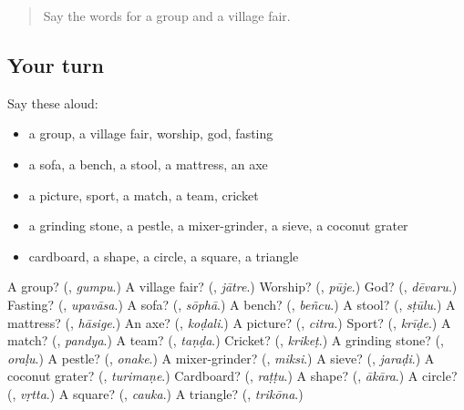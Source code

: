 \begin{quote}
Say the words for a group and a village fair.
\end{quote}

\subsection*{Your turn}
Say these aloud:

\begin{itemize}
\raggedright
  \item a group, a village fair, worship, god, fasting
  \item a sofa, a bench, a stool, a mattress, an axe
  \item a picture, sport, a match, a team, cricket
  \item a grinding stone, a pestle, a mixer-grinder, a sieve, a coconut grater
  \item cardboard, a shape, a circle, a square, a triangle
\end{itemize}

\begin{tcolorbox}[breakable,colback=teal!4,colframe=teal!35!black,title={Before you move on}]
A group? (\textbf{}, \emph{gumpu}.) A village fair? (\textbf{}, \emph{jātre}.) Worship? (\textbf{}, \emph{pūje}.) God? (\textbf{}, \emph{dēvaru}.) Fasting? (\textbf{}, \emph{upavāsa}.) A sofa? (\textbf{}, \emph{sōphā}.) A bench? (\textbf{}, \emph{beñcu}.) A stool? (\textbf{}, \emph{sṭūlu}.) A mattress? (\textbf{}, \emph{hāsige}.) An axe? (\textbf{}, \emph{koḍali}.) A picture? (\textbf{}, \emph{citra}.) Sport? (\textbf{}, \emph{krīḍe}.) A match? (\textbf{}, \emph{pandya}.) A team? (\textbf{}, \emph{taṇḍa}.) Cricket? (\textbf{}, \emph{krikeṭ}.) A grinding stone? (\textbf{}, \emph{oraḷu}.) A pestle? (\textbf{}, \emph{onake}.) A mixer-grinder? (\textbf{}, \emph{miksi}.) A sieve? (\textbf{}, \emph{jaraḍi}.) A coconut grater? (\textbf{}, \emph{turimaṇe}.) Cardboard? (\textbf{}, \emph{raṭṭu}.) A shape? (\textbf{}, \emph{ākāra}.) A circle? (\textbf{}, \emph{vṛtta}.) A square? (\textbf{}, \emph{cauka}.) A triangle? (\textbf{}, \emph{trikōna}.)
\end{tcolorbox}
